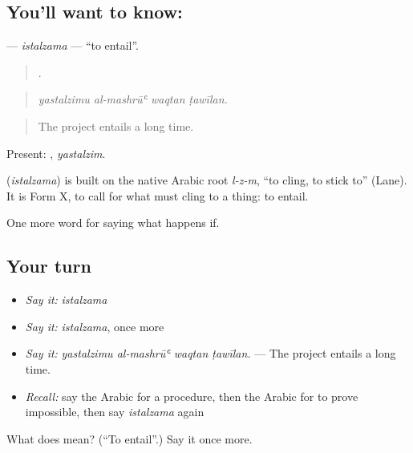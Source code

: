 \subsection*{You'll want to know: }
\textbf{} — \emph{istalzama} — \textquotedblleft{}to entail\textquotedblright{}.

\begin{quote}
   .
\end{quote}

\begin{quote}
\emph{yastalzimu al-mashrūʿ waqtan ṭawīlan.}
\end{quote}

\begin{quote}
The project entails a long time.
\end{quote}

Present: , \emph{yastalzim}.

\begin{cousinweb}
\textbf{} (\emph{istalzama}) is built on the native Arabic root \emph{l-z-m}, \textquotedblleft{}to cling, to stick to\textquotedblright{} (Lane). It is Form X, to call for what must cling to a thing: to entail.
\end{cousinweb}

\begin{grammarlens}[title={What you've built}]
One more word for saying what happens if.
\end{grammarlens}

\subsection*{Your turn}
\begin{itemize}
\raggedright
  \item \emph{Say it:} \emph{istalzama}
  \item \emph{Say it:} \emph{istalzama}, once more
  \item \emph{Say it:} \emph{yastalzimu al-mashrūʿ waqtan ṭawīlan.} — The project entails a long time.
  \item \emph{Recall:} say the Arabic for a procedure, then the Arabic for to prove impossible, then say \emph{istalzama} again
\end{itemize}

\begin{tcolorbox}[breakable,colback=teal!4,colframe=teal!35!black,title={Before you move on}]
What does  mean? (\textquotedblleft{}To entail\textquotedblright{}.) Say it once more.
\end{tcolorbox}
